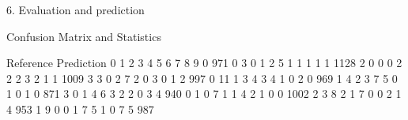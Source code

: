 \documentclass[10pt,ignorenonframetext,]{beamer}
\newenvironment{Shaded}{\begin{snugshade}}{\end{snugshade}}
\newcommand{\KeywordTok}[1]{\textcolor[rgb]{0.13,0.29,0.53}{\textbf{#1}}}
\newcommand{\DecValTok}[1]{\textcolor[rgb]{0.00,0.00,0.81}{#1}}
\newcommand{\StringTok}[1]{\textcolor[rgb]{0.31,0.60,0.02}{#1}}
\newcommand{\CommentTok}[1]{\textcolor[rgb]{0.56,0.35,0.01}{\textit{#1}}}
\newcommand{\OperatorTok}[1]{\textcolor[rgb]{0.81,0.36,0.00}{\textbf{#1}}}
\newcommand{\NormalTok}[1]{#1}
\begin{document}
\begin{frame}[fragile]

\begin{block}{6. Evaluation and prediction}

\begin{Shaded}
\end{Shaded}

\begin{Shaded}
\begin{Highlighting}[]
\NormalTok{Confusion Matrix and Statistics}

\NormalTok{          Reference}
\NormalTok{Prediction    }\DecValTok{0}    \DecValTok{1}    \DecValTok{2}    \DecValTok{3}    \DecValTok{4}    \DecValTok{5}    \DecValTok{6}    \DecValTok{7}    \DecValTok{8}    \DecValTok{9}
         \DecValTok{0}  \DecValTok{971}    \DecValTok{0}    \DecValTok{3}    \DecValTok{0}    \DecValTok{1}    \DecValTok{2}    \DecValTok{5}    \DecValTok{1}    \DecValTok{1}    \DecValTok{1}
         \DecValTok{1}    \DecValTok{1} \DecValTok{1128}    \DecValTok{2}    \DecValTok{0}    \DecValTok{0}    \DecValTok{0}    \DecValTok{2}    \DecValTok{2}    \DecValTok{2}    \DecValTok{3}
         \DecValTok{2}    \DecValTok{1}    \DecValTok{1} \DecValTok{1009}    \DecValTok{3}    \DecValTok{3}    \DecValTok{0}    \DecValTok{2}    \DecValTok{7}    \DecValTok{2}    \DecValTok{0}
         \DecValTok{3}    \DecValTok{0}    \DecValTok{1}    \DecValTok{2}  \DecValTok{997}    \DecValTok{0}   \DecValTok{11}    \DecValTok{1}    \DecValTok{3}    \DecValTok{4}    \DecValTok{3}
         \DecValTok{4}    \DecValTok{1}    \DecValTok{0}    \DecValTok{2}    \DecValTok{0}  \DecValTok{969}    \DecValTok{1}    \DecValTok{4}    \DecValTok{2}    \DecValTok{3}    \DecValTok{7}
         \DecValTok{5}    \DecValTok{0}    \DecValTok{1}    \DecValTok{0}    \DecValTok{1}    \DecValTok{0}  \DecValTok{871}    \DecValTok{3}    \DecValTok{0}    \DecValTok{1}    \DecValTok{4}
         \DecValTok{6}    \DecValTok{3}    \DecValTok{2}    \DecValTok{2}    \DecValTok{0}    \DecValTok{3}    \DecValTok{4}  \DecValTok{940}    \DecValTok{0}    \DecValTok{1}    \DecValTok{0}
         \DecValTok{7}    \DecValTok{1}    \DecValTok{1}    \DecValTok{4}    \DecValTok{2}    \DecValTok{1}    \DecValTok{0}    \DecValTok{0} \DecValTok{1002}    \DecValTok{2}    \DecValTok{3}
         \DecValTok{8}    \DecValTok{2}    \DecValTok{1}    \DecValTok{7}    \DecValTok{0}    \DecValTok{0}    \DecValTok{2}    \DecValTok{1}    \DecValTok{4}  \DecValTok{953}    \DecValTok{1}
         \DecValTok{9}    \DecValTok{0}    \DecValTok{0}    \DecValTok{1}    \DecValTok{7}    \DecValTok{5}    \DecValTok{1}    \DecValTok{0}    \DecValTok{7}    \DecValTok{5}  \DecValTok{987}


\end{Highlighting}
\end{Shaded}
\end{block}
\end{frame}
\end{document}
